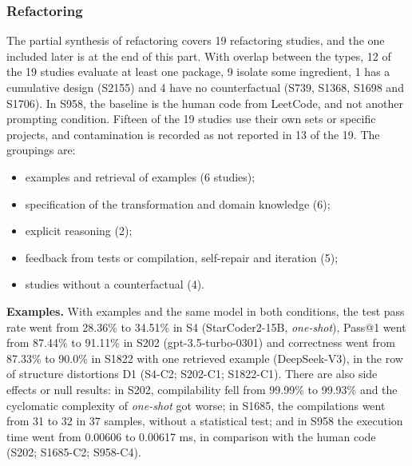 \subsubsection{Refactoring}

The partial synthesis of refactoring covers 19 refactoring studies, and the one included later is at the end of this part. With overlap between the types, 12 of the 19 studies evaluate at least one package, 9 isolate some ingredient, 1 has a cumulative design (S2155) and 4 have no counterfactual (S739, S1368, S1698 and S1706). In S958, the baseline is the human code from LeetCode, and not another prompting condition. Fifteen of the 19 studies use their own sets or specific projects, and contamination is recorded as not reported in 13 of the 19. The groupings are:
\begin{itemize}
  \item examples and retrieval of examples (6 studies);
  \item specification of the transformation and domain knowledge (6);
  \item explicit reasoning (2);
  \item feedback from tests or compilation, self-repair and iteration (5);
  \item studies without a counterfactual (4).
\end{itemize}

\textbf{Examples.}
With examples and the same model in both conditions, the test pass rate went from 28.36\% to 34.51\% in S4 (StarCoder2-15B, \textit{one-shot}), Pass@1 went from 87.44\% to 91.11\% in S202 (gpt-3.5-turbo-0301) and correctness went from 87.33\% to 90.0\% in S1822 with one retrieved example (DeepSeek-V3), in the row of structure distortions D1 (S4-C2; S202-C1; S1822-C1).
There are also side effects or null results: in S202, compilability fell from 99.99\% to 99.93\% and the cyclomatic complexity of \textit{one-shot} got worse; in S1685, the compilations went from 31 to 32 in 37 samples, without a statistical test; and in S958 the execution time went from 0.00606 to 0.00617 ms, in comparison with the human code (S202; S1685-C2; S958-C4).

